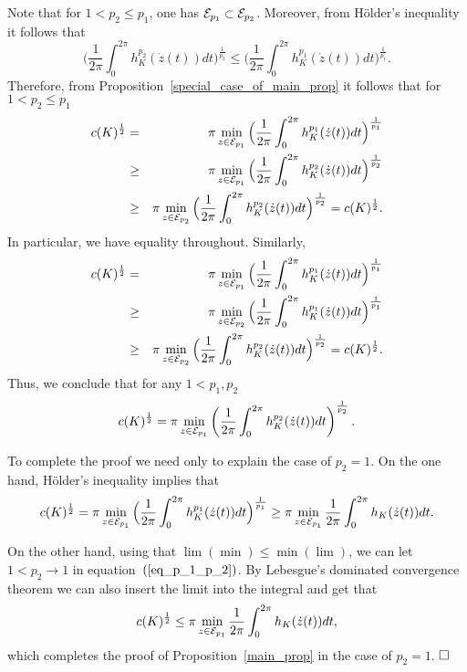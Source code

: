 \documentclass[12pt]{article}
\begin{document}
 Note that for $1<p_2 \le p_1$, one has ${\cal
E}_{p_1} \subset {\cal E}_{p_2}$. Moreover, from H\"{o}lder's
inequality it follows that
\[ \Big(
\frac{1}{2\pi} \int_0^{2\pi} h_K^{p_2}(\dot{z}(t))dt \Big )^{\frac 1 {p_2}}
\le \Big ( \frac{1}{2\pi} \int_0^{2\pi}
h_K^{p_1}(\dot{z}(t))dt \Big )^{\frac 1 {p_1}}.
\]
Therefore, from Proposition~\ref{special_case_of_main_prop} it follows that for $1 < p_2\le p_1$
\begin{eqnarray*}
%
c(K)^{\frac 1 2} &= &\pi \min_{z\in {\cal E}_{p_1}} \Big(
\frac{1}{2\pi}
\int_0^{2\pi} h_K^{p_1}(\dot{z}(t))dt\Big)^{\frac 1 {p_1} }\\
& \ge & \pi \min_{z\in {\cal E}_{p_1}} \Big( \frac{1}{2\pi}
\int_0^{2\pi} h_K^{p_2}(\dot{z}(t))dt\Big)^{\frac 1 {p_2}}\\
& \ge & \pi \min_{z\in {\cal E}_{p_2}} \Big( \frac{1}{2\pi}
\int_0^{2\pi} h_K^{p_2}(\dot{z}(t))dt\Big)^{\frac 1 {p_2}} =
c(K)^{\frac 1 2}.
\end{eqnarray*}
In particular, we have equality throughout. Similarly,
\begin{eqnarray*}
c(K)^{\frac 1 2} &= &\pi \min_{z\in {\cal E}_{p_1}} \Big(
\frac{1}{2\pi}
\int_0^{2\pi} h_K^{p_1}(\dot{z}(t))dt\Big)^{\frac 1 {p_1} }\\
& \ge & \pi \min_{z\in {\cal E}_{p_2}} \Big( \frac{1}{2\pi}
\int_0^{2\pi} h_K^{p_1}(\dot{z}(t))dt\Big)^{\frac 1 {p_1}}\\
& \ge & \pi \min_{z\in {\cal E}_{p_2}} \Big( \frac{1}{2\pi}
\int_0^{2\pi} h_K^{p_2}(\dot{z}(t))dt\Big)^{\frac 1 {p_2}} =
c(K)^{\frac 1 2}.
\end{eqnarray*}
Thus, we conclude that for any $1<p_1,p_2$
%
\begin{equation} \label{eq_p_1_p_2} c(K)^{\frac 1 2} = \pi \min_{z\in {\cal E}_{p_1}} \left( \frac{1}{2\pi}
\int_0^{2\pi} h_K^{p_2}(\dot{z}(t))dt\right)^{\frac 1 {p_2}}.
\end{equation}

To complete the proof we need only to explain the case of $p_2=1$.
On the one hand, H\"older's inequality implies that
\[c(K)^{\frac 1 2} = \pi \min_{z\in {\cal E}_{p_1}}
\Big( \frac{1}{2\pi} \int_0^{2\pi}
h_K^{p_1}(\dot{z}(t))dt\Big)^{\frac 1 {p_1} }
 \ge  \pi \min_{z\in {\cal E}_{p_1}}\frac{1}{2\pi}
\int_0^{2\pi} h_K(\dot{z}(t))dt.\]

On the other hand, using that $\lim (\min) \le \min (\lim)$, we can
let $1< p_2 \to 1$ in equation~$(\ref{eq_p_1_p_2})$. By Lebesgue's
dominated convergence theorem we can also insert the limit into the
integral and get that
\[c(K)^{\frac 1 2} \le \pi \min_{z\in {\cal
E}_{p_1}}\frac{1}{2\pi} \int_0^{2\pi} h_K(\dot{z}(t))dt,\]
which completes the proof of Proposition~\ref{main_prop} in the case
of $p_2 = 1$. $\hfill \square$
\end{document}
